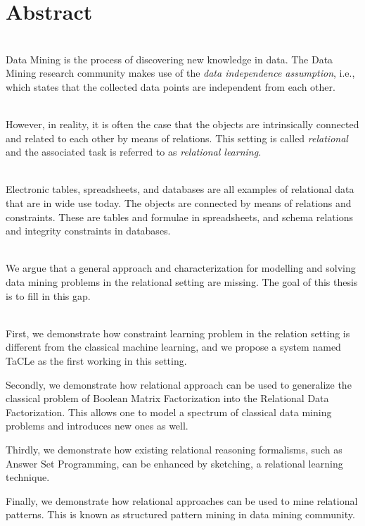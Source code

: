 \chapter{Abstract} \label{ch:abstract}

\\
Data Mining is the process of discovering new knowledge in data.
The Data Mining research community makes use of the  \textit{data
independence assumption}, i.e., which states that the collected data points are independent from each other.

\\
However, in reality, it is often the case that the objects are 
intrinsically connected and related to each other by means of relations. 
This setting is called \textit{relational} and the associated task 
is referred to as \textit{relational learning}.

\\
Electronic tables, spreadsheets, and databases are all examples of
relational data that are in wide use today. The objects are connected
by means of relations and constraints. These are
tables and formulae in spreadsheets, and  schema relations and integrity
constraints in databases.

\\
We argue that a general approach and characterization for modelling and solving data mining  
problems in the relational setting are missing. The goal of this thesis
is to fill in this gap.


\\
First, we demonstrate how constraint learning problem in the relation
setting is different from the classical machine learning, and we
propose a system named TaCLe as the first working in this setting.

Secondly, we demonstrate how relational approach can be used to
generalize the classical problem of Boolean Matrix Factorization into the Relational
Data Factorization. This allows one to model a spectrum of classical data
mining problems and introduces new ones as well.

Thirdly, we demonstrate how existing relational reasoning formalisms,
such as Answer Set Programming, can be enhanced by sketching, a relational learning
technique.

Finally, we demonstrate how relational approaches can be used
to mine relational patterns. This is known as structured pattern mining in
data mining community.


\cleardoublepage

